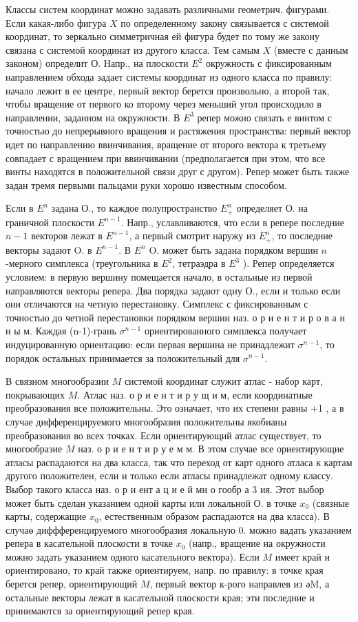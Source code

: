 \documentclass[10pt]{article}
\begin{document}
Классы систем координат можно задавать различными геометрич. фигурами. Если какая-либо фигура $X$ по определенному закону связывается с системой координат, то зеркально симметричная ей фигура будет по тому же закону связана с системой координат из другого класса. Тем самым $X$ (вместе с данным законом) определит О. Напр., на плоскости $E^{2}$ окружность с фиксированным направлением обхода задает системы координат из одного класса по правилу: начало лежит в ее центре, первый вектор берется произвольно, а второй так, чтобы вращение от первого ко второму через меньший угол происходило в направлении, заданном на окружности. В $E^{3}$ репер можно связать $е$ винтом с точностью до непрерывного вращения и растяжения пространства: первый вектор идет по направлению ввинчивания, вращение от второго вектора к третьему совпадает с вращением при ввинчивании (предполагается при этом, что все винты находятся в положительной связи друг с другом). Репер может быть также задан тремя первыми пальцами руки хорошо известным способом.

Если в $E^{n}$ задана О., то каждое полупространство $E_{+}^{n}$ определяет О. на граничной плоскости $E^{n-1}$. Напр., уславливаются, что если в репере последние $n-1$ векторов лежат в $E^{n-1}$, а первый смотрит наружу из $E_{+}^{n}$, то последние векторы задают O. в $E^{n-1}$. В $E^{n}$ O. может быть задана порядком вершин $n$-мерного симплекса (треугольника в $E^{2}$, тетраэдра в $E^{3}$ ). Репер определяется условием: в первую вершину помещается начало, в остальные из первой направляются векторы репера. Два порядка задают одну О., если и только если они отличаются на четную перестановку. Симплекс с фиксированным с точностью до четной перестановки порядком вершин наз. о р и е н т и р о в а н н ы м. Каждая (n-1)-грань $\sigma^{n-1}$ ориентированного симплекса получает индуцированную ориентацию: если первая вершина не принадлежит $\sigma^{n-1}$, то порядок остальных принимается за положительный для $\sigma^{n-1}$.

В связном многообразии $M$ системой координат служит атлас - набор карт, покрывающих $M$. Атлас наз. о р и е н т и р у щ и м, если координатные преобразования все положительны. Это означает, что их степени равны +1 , а в случае дифференцируемого многообразия положительны якобианы преобразования во всех точках. Если ориентирующий атлас существует, то многообразие $M$ наз. о р и е н т и р у е м м. В этом случае все ориентирующие атласы распадаются на два класса, так что переход от карт одного атласа к картам другого положителен, если и только если атласы принадлежат одному классу. Выбор такого класса наз. о р и ент а ц и е й мн о гообр а 3 ия. Этот выбор может быть сделан указанием одной карты или локальной О. в точке $x_{0}$ (связные карты, содержащие $x_{0}$, естественным образом распадаются на два класса). В случаө диффференцируемого многообразия локальную 0. можно вадать указанием репера в касательной плоскости в точке $x_{0}$ (напр., вращение на окружности можно задать указанием одного касательного вектора). Если $M$ имеет край и ориентировано, то край также ориентируем, напр. по правилу: в точке края берется репер, ориентирующий $M$, первый вектор к-рого направлев из әM, а остальные векторы лежат в касательной плоскости края; эти последние и принимаются за ориентирующий репер края.
\end{document}
